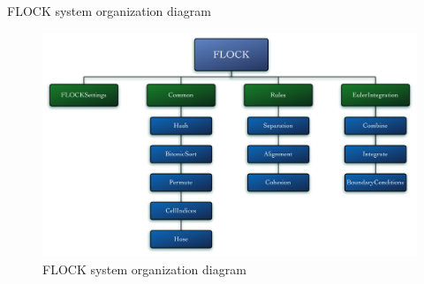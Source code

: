 \documentclass[red]{beamer}
\begin{document}
\begin{frame}{FLOCK system organization diagram}
	\begin{figure}[htbp]
	\begin{center}
	\includegraphics[scale=0.25]{../figures/FLOCKdiagramMyrna.pdf}
	\caption{FLOCK system organization diagram}
	\end{center}
	\end{figure}
\end{frame}


\end{document}
